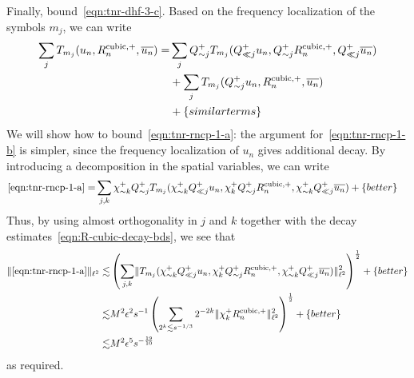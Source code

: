 \documentclass[letterpaper, reqno,final]{amsart}
\newcommand{\btext}[1]{\left\{\textup{#1}\right\}}
\newcommand{\bbetter}{\btext{better}}
\newcommand{\bsim}{\btext{similar terms}}
\begin{document}
Finally, bound~\eqref{eqn:tnr-dhf-3-c}.  Based on the frequency localization of the symbols $m_j$, we can write
\begin{subequations}\begin{align}
    \sum_{j} T_{m_j}(u_n, R_n^{\text{cubic},+}, \overline{u_n}) =& \sum_{j} Q_{\sim j}^+T_{m_j}(Q_{\ll j}^+u_n, Q_{\sim j}^+R_n^{\text{cubic},+}, Q_{\ll j}^+\overline{u_n})\label{eqn:tnr-rncp-1-a}\\
    &+ \sum_{j} T_{m_j}(Q_{\sim j}^+u_n, R_n^{\text{cubic},+}, \overline{u_n})\label{eqn:tnr-rncp-1-b}\\
    &+ \bsim\notag
\end{align}\end{subequations}
We will show how to bound~\eqref{eqn:tnr-rncp-1-a}: the argument for~\eqref{eqn:tnr-rncp-1-b} is simpler, since the frequency localization of $u_n$ gives additional decay.  By introducing a decomposition in the spatial variables, we can write
\begin{equation*}\begin{split}
    \eqref{eqn:tnr-rncp-1-a} =& \sum_{j,k} \chi_{\sim k}^+ Q_{\sim j}^+T_{m_j}(\chi_{\sim k}^+ Q_{\ll j}^+u_n, \chi_{k}^+ Q_{\sim j}^+R_n^{\text{cubic},+}, \chi_{\sim k}^+ Q_{\ll j}^+\overline{u_n}) + \bbetter
\end{split}\end{equation*}
Thus, by using almost orthogonality in $j$ and $k$ together with the decay estimates~\eqref{eqn:R-cubic-decay-bds}, we see that
\begin{equation*}\begin{split}
    \lVert \eqref{eqn:tnr-rncp-1-a} \rVert_{\ell^2} \lesssim& \left( \sum_{j,k} \lVert T_{m_j}(\chi_{\sim k}^+Q_{\ll j}^+u_n, \chi_{k}^+ Q_{\sim j}^+R_n^{\text{cubic},+}, \chi_{\sim k}^+ Q_{\ll j}^+\overline{u_n}) \rVert_{\ell^2}^2 \right)^{\frac{1}{2}} + \bbetter\\
    \lesssim& M^2\epsilon^2 s^{-1} \left( \sum_{2^k \lesssim s^{-1/3}} 2^{-2k}\lVert \chi_{k}^+ R_n^{\text{cubic},+} \rVert_{\ell^2}^2 \right)^{\frac{1}{2}} + \bbetter\\
    \lesssim& M^2 \epsilon^5 s^{-\frac{19}{10}}
\end{split}
\end{equation*}
as required.
\end{document}
